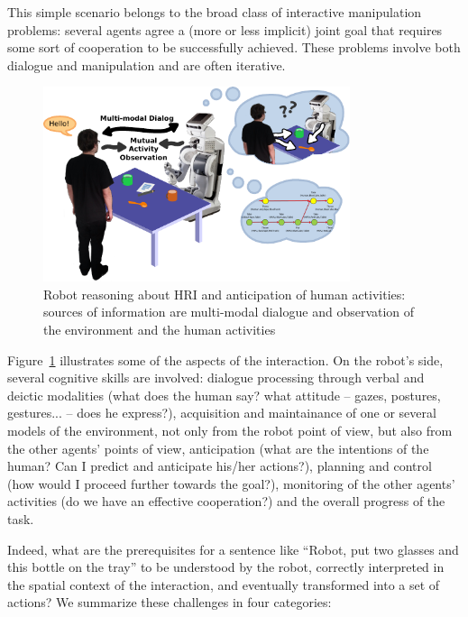 \documentclass{svmult}
\begin{document}
This simple scenario belongs to the broad class of interactive
manipulation problems: several agents agree a (more or less implicit) joint
goal that requires some sort of cooperation to be successfully achieved. These
problems involve both dialogue and manipulation and are often iterative.


\begin{figure}[htb]
\centering
\includegraphics[width=9cm]{figs/grounding_robot.pdf}
\caption{Robot reasoning about HRI and anticipation of human activities:
  sources of information are multi-modal dialogue and observation of
  the environment and the human activities}
\label{fig|hri-dec}
\end{figure}

Figure~\ref{fig|hri-dec} illustrates some of the aspects of the interaction.
On the robot's side, several cognitive skills are involved: dialogue
processing through verbal and deictic modalities (what does the human say? what
attitude -- gazes, postures, gestures... -- does he express?), acquisition
and maintainance of one or several models of the environment, not only from the
robot point of view, but also from the other agents' points of view,
anticipation (what are the intentions of the human? Can I predict and
anticipate his/her actions?), planning and control (how would I proceed further
towards the goal?), monitoring of the other agents' activities (do we have an
effective cooperation?) and the overall progress of the task. 

Indeed, what are the prerequisites for a sentence like ``Robot, put two glasses and
this bottle on the tray'' to be understood by the robot, correctly
interpreted in the spatial context of the interaction, and eventually
transformed into a set of actions? We summarize these challenges in four
categories:
\end{document}
